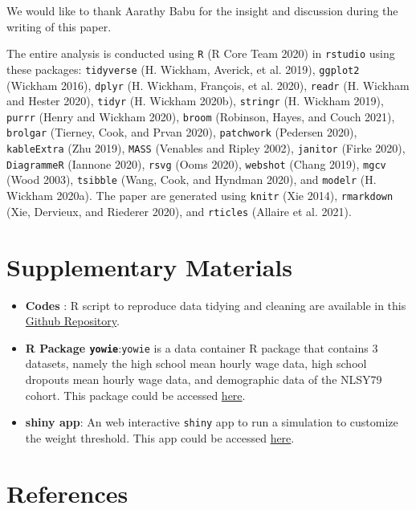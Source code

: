 \documentclass{article}
\begin{document}
We would like to thank Aarathy Babu for the insight and discussion during the writing of this paper.

The entire analysis is conducted using \texttt{R} (R Core Team 2020) in \texttt{rstudio} using these packages: \texttt{tidyverse} (H. Wickham, Averick, et al. 2019), \texttt{ggplot2} (Wickham 2016), \texttt{dplyr} (H. Wickham, François, et al. 2020), \texttt{readr} (H. Wickham and Hester 2020), \texttt{tidyr} (H. Wickham 2020b), \texttt{stringr} (H. Wickham 2019), \texttt{purrr} (Henry and Wickham 2020), \texttt{broom} (Robinson, Hayes, and Couch 2021), \texttt{brolgar} (Tierney, Cook, and Prvan 2020), \texttt{patchwork} (Pedersen 2020), \texttt{kableExtra} (Zhu 2019), \texttt{MASS} (Venables and Ripley 2002), \texttt{janitor} (Firke 2020), \texttt{DiagrammeR} (Iannone 2020), \texttt{rsvg} (Ooms 2020), \texttt{webshot} (Chang 2019), \texttt{mgcv} (Wood 2003), \texttt{tsibble} (Wang, Cook, and Hyndman 2020), and \texttt{modelr} (H. Wickham 2020a). The paper are generated using \texttt{knitr} (Xie 2014), \texttt{rmarkdown} (Xie, Dervieux, and Riederer 2020), and \texttt{rticles} (Allaire et al. 2021).

\hypertarget{supplementary-materials}{%
\section{Supplementary Materials}\label{supplementary-materials}}

\begin{itemize}
\item
  \textbf{Codes} : R script to reproduce data tidying and cleaning are available in this \href{https://github.com/numbats/yowie/blob/master/data-raw/data_preprocessing.R}{Github Repository}.
\item
  \textbf{R Package \texttt{yowie}}:\texttt{yowie} is a data container R package that contains 3 datasets, namely the high school mean hourly wage data, high school dropouts mean hourly wage data, and demographic data of the NLSY79 cohort. This package could be accessed \href{https://github.com/numbats/yowie}{here}.
\item
  \textbf{shiny app}: An web interactive \texttt{shiny} app to run a simulation to customize the weight threshold. This app could be accessed \href{https://github.com/numbats/summer-wages-refresh/tree/main/app}{here}.
\end{itemize}

\hypertarget{references}{%
\section*{References}\label{references}}
\end{document}
